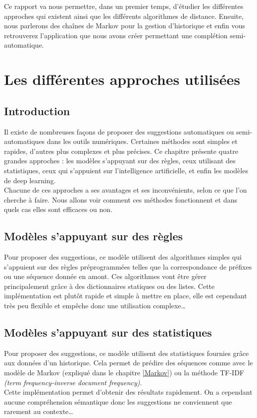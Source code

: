 \documentclass[a4paper, 11pt]{report}
\begin{document}
Ce rapport va nous permettre, dans un premier temps, d’étudier les différentes approches qui existent ainsi que  les différents algorithmes de distance. Ensuite, nous parlerons  des chaînes de Markov pour la gestion d'historique et enfin vous retrouverez l'application que nous avons créer permettant une complétion semi-automatique.\par
\vfill

\chapter{Les différentes approches utilisées}

\section{Introduction}

Il existe de nombreuses façons de proposer des suggestions automatiques ou semi-automatiques dans les outils numériques. Certaines méthodes sont simples et rapides, d’autres plus complexes et plus précises. Ce chapitre présente quatre grandes approches : les modèles s'appuyant sur des règles, ceux utilisant des statistiques, ceux qui s’appuient sur l’intelligence artificielle, et enfin les modèles de deep learning. \\

Chacune de ces approches a ses avantages et ses inconvénients, selon ce que l’on cherche à faire. Nous allons voir comment ces méthodes fonctionnent et dans quels cas elles sont efficaces ou non.

\section{Modèles s'appuyant sur des règles}
Pour proposer des suggestions, ce modèle utilisent des algorithmes simples qui s'appuient sur des règles préprogrammées telles que la correspondance de préfixes ou une séquence donnée en amont. Ces algorithmes vont être gérer principalement grâce à des dictionnaires statiques ou des listes.  Cette implémentation est plutôt rapide et simple à mettre en place, elle est cependant très peu flexible et empêche donc une utilisation complexe\dots

\section{Modèles s'appuyant sur des statistiques}
Pour proposer des suggestions, ce modèle utilisent des statistiques fournies grâce aux données d'un historique. Cela permet de prédire des séquences comme avec le modèle de Markov (expliqué dans le chapitre \ref{Markov}) ou la méthode TF-IDF \textit{(term frequency-inverse document frequency)}.\\
Cette implémentation permet d'obtenir des résultats rapidement. On a cependant aucune compréhension sémantique donc les suggestions ne conviennent que rarement au contexte\dots
\newpage
\end{document}

